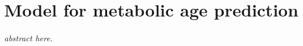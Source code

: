 
\chapter{Model for metabolic age prediction} \label{chap:frassoni}

\begin{displayquote}
	\textit{abstract here.}
\end{displayquote}

